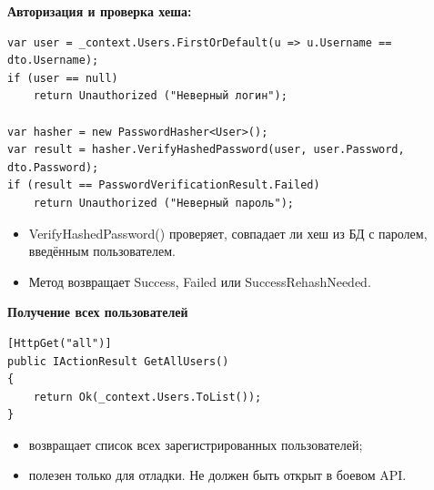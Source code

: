 \documentclass[12pt]{article}
\renewcommand{\texttt}[1]{{\small\ttfamily #1}}
\numberwithin{listing}{section}
\numberwithin{figure}{section}
\begin{document}
\noindent \textbf{Авторизация и проверка хеша:}
\begin{verbatim}
var user = _context.Users.FirstOrDefault(u => u.Username == dto.Username);
if (user == null)
    return Unauthorized ("Неверный логин");

var hasher = new PasswordHasher<User>();
var result = hasher.VerifyHashedPassword(user, user.Password, dto.Password);
if (result == PasswordVerificationResult.Failed)
    return Unauthorized ("Неверный пароль");
\end{verbatim}
\begin{itemize}
	\item \texttt{VerifyHashedPassword()} проверяет, совпадает ли хеш из БД с паролем, введённым пользователем.
	\item Метод возвращает \texttt{Success}, \texttt{Failed} или \texttt{SuccessRehashNeeded}.
\end{itemize}

\noindent \textbf{Получение всех пользователей}
\begin{verbatim}
[HttpGet("all")]
public IActionResult GetAllUsers()
{
    return Ok(_context.Users.ToList());
}
\end{verbatim}
\begin{itemize}
	\item возвращает список всех зарегистрированных пользователей;
	\item полезен только для отладки. Не должен быть открыт в боевом API.
\end{itemize}
\end{document}
